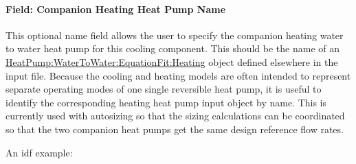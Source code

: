 \paragraph{Field: Companion Heating Heat Pump Name}\label{field-heating-companion-name}

This optional name field allows the user to specify the companion heating water to water heat pump for this cooling component.  This should be the name of an \hyperref[heatpumpwatertowaterequationfitheating]{HeatPump:WaterToWater:EquationFit:Heating} object defined elsewhere in the input file.  Because the cooling and heating models are often intended to represent separate operating modes of one single reversible heat pump, it is useful to identify the corresponding heating heat pump input object by name.  This is currently used with autosizing so that the sizing calculations can be coordinated so that the two companion heat pumps get the same design reference flow rates.

An idf example:

